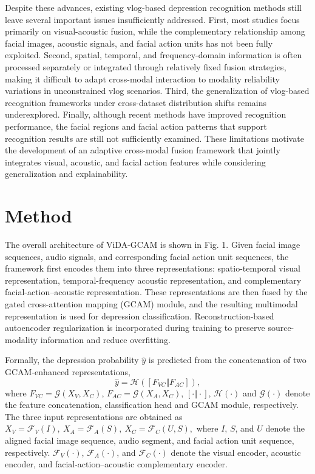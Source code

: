 \documentclass[a4paper,fleqn]{cas-dc}
\begin{document}
Despite these advances, existing vlog-based depression recognition methods still leave several important issues insufficiently addressed. First, most studies focus primarily on visual-acoustic fusion, while the complementary relationship among facial images, acoustic signals, and facial action units has not been fully exploited. Second, spatial, temporal, and frequency-domain information is often processed separately or integrated through relatively fixed fusion strategies, making it difficult to adapt cross-modal interaction to modality reliability variations in unconstrained vlog scenarios. Third, the generalization of vlog-based recognition frameworks under cross-dataset distribution shifts remains underexplored. Finally, although recent methods have improved recognition performance, the facial regions and facial action patterns that support recognition results are still not sufficiently examined. These limitations motivate the development of an adaptive cross-modal fusion framework that jointly integrates visual, acoustic, and facial action features while considering generalization and explainability.

\section{Method}
The overall architecture of ViDA-GCAM is shown in Fig. 1. Given facial image sequences, audio signals, and corresponding facial action unit sequences, the framework first encodes them into three representations: spatio-temporal visual representation, temporal-frequency acoustic representation, and complementary facial-action–acoustic representation. These representations are then fused by the gated cross-attention mapping (GCAM) module, and the resulting multimodal representation is used for depression classification. Reconstruction-based autoencoder regularization is incorporated during training to preserve source-modality information and reduce overfitting.



Formally, the depression probability $\hat{y}$ is predicted from the concatenation of two GCAM-enhanced representations,
\begin{equation}
\hat{y}=\mathcal{H}\left(
\left[
F_{VC}
\Vert
F_{AC}
\right]
\right),
\end{equation}
where  $F_{VC} = \mathcal{G}(X_V, X_C)$, $F_{AC} = \mathcal{G}(X_A, X_C)$, $[\cdot \Vert \cdot]$, $\mathcal{H}(\cdot)$ and $\mathcal{G}(\cdot)$ denote the feature concatenation, classification head and  GCAM module, respectively. The three input representations are obtained as $X_V = \mathcal{F}_V(I), ~
X_A = \mathcal{F}_A(S), ~
X_C = \mathcal{F}_C(U, S),$
where $I$, $S$, and $U$ denote the aligned facial image sequence, audio segment, and facial action unit sequence, respectively. 
$\mathcal{F}_V(\cdot)$, $\mathcal{F}_A(\cdot)$, and $\mathcal{F}_C(\cdot)$ denote the visual encoder, acoustic encoder, and facial-action--acoustic complementary encoder.  
\end{document}

